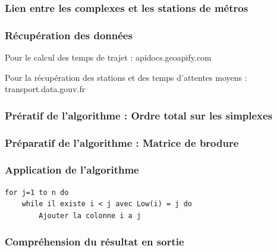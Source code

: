 \documentclass{beamer}
\begin{document}
\begin{frame}
    \frametitle{Lien entre les complexes et les stations de métros}
    
    
\end{frame}

\begin{frame}
    \frametitle{Récupération des données}
    Pour le calcul des temps de trajet :  apidocs.geoapify.com

    Pour la récupération des stations et des temps d'attentes moyens : transport.data.gouv.fr
\end{frame}

\begin{frame}
    \frametitle{Prératif de l'algorithme : Ordre total sur les simplexes}
\end{frame}


\begin{frame}
    \frametitle{Préparatif de l'algorithme : Matrice de brodure}
\end{frame}


\begin{frame}[fragile]
    \frametitle{Application de l'algorithme}
      \begin{lstlisting}
for j=1 to n do
    while il existe i < j avec Low(i) = j do
        Ajouter la colonne i a j
      \end{lstlisting}
  \end{frame}


\begin{frame}
    \frametitle{Compréhension du résultat en sortie}
\end{frame}
\end{document}
